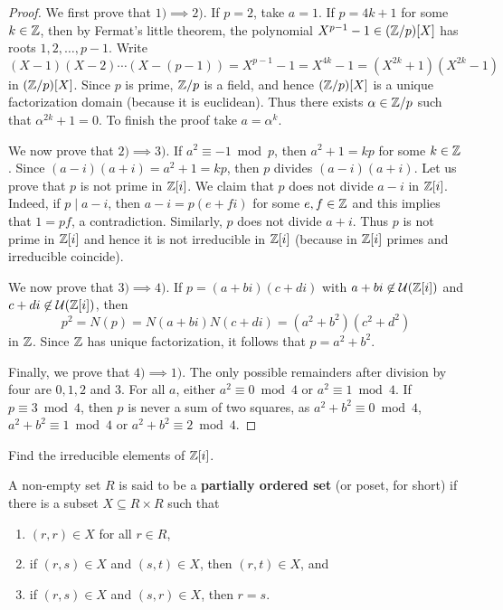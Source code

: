 \begin{proof}
    We first prove that $1)\implies 2)$. If $p=2$, take $a=1$. If $p=4k+1$ for some $k\in\mathbb{Z}$, then
    by Fermat's little theorem, the polynomial 
    $X^{p-1}-1\in(\mathbb{Z}/p)[X]$ has roots $1,2,\dots,p-1$. Write
    \[
    (X-1)(X-2)\cdots (X-(p-1))=X^{p-1}-1=X^{4k}-1=(X^{2k}+1)(X^{2k}-1)
    \]
    in $(\mathbb{Z}/p)[X]$. Since $p$ is prime, $\mathbb{Z}/p$ is a field, and hence 
    $(\mathbb{Z}/p)[X]$ is a unique factorization domain (because it is euclidean). Thus 
    there exists $\alpha\in\mathbb{Z}/p$ such that $\alpha^{2k}+1=0$. To finish the proof
    take $a=\alpha^k$. 
    
    We now prove that $2)\implies 3)$. If $a^2\equiv-1\bmod p$, then $a^2+1=kp$ 
    for some $k\in\mathbb{Z}$. Since $(a-i)(a+i)=a^2+1=kp$, then $p$ divides $(a-i)(a+i)$. Let us prove that $p$ is not prime in $\mathbb{Z}[i]$. 
    We claim that $p$ does not divide $a-i$ in $\mathbb{Z}[i]$. Indeed, if $p\mid a-i$, then
    $a-i=p(e+fi)$ for some $e,f\in\mathbb{Z}$ and this implies that $1=pf$, a contradiction. Similarly,
    $p$ does not divide $a+i$. Thus $p$ is not prime in $\mathbb{Z}[i]$ 
    and hence it is not irreducible in $\mathbb{Z}[i]$ (because in $\mathbb{Z}[i]$ primes and irreducible coincide). 
    
    We now prove that $3)\implies 4)$. If $p=(a+bi)(c+di)$ with $a+bi\not\in\mathcal{U}(\mathbb{Z}[i])$
    and  $c+di\not\in\mathcal{U}(\mathbb{Z}[i])$, then
    \[
    p^2=N(p)=N(a+bi)N(c+di)=(a^2+b^2)(c^2+d^2)
    \]
    in $\mathbb{Z}$. Since $\mathbb{Z}$ has unique factorization, it follows that $p=a^2+b^2$. 
    
    Finally, we prove that $4)\implies 1)$. 
    The only possible remainders after division by four are $0,1,2$ and $3$.  
    For all $a$, either $a^2\equiv 0\bmod 4$ or $a^2\equiv 1\bmod 4$. 
    If $p\equiv3\bmod 4$, then $p$ is never a sum of two squares, as 
    $a^2+b^2\equiv 0\bmod 4$, $a^2+b^2\equiv 1\bmod 4$ or $a^2+b^2\equiv 2\bmod 4$. 
\end{proof}

\begin{exercise}
\label{xca:Z[i]irreducibles}
Find the irreducible elements of $\mathbb{Z}[i]$. 
\end{exercise}



\begin{definition}
A non-empty set $R$ is said to be a \textbf{partially ordered set} (or poset, for short) 
if there is a subset $X\subseteq R\times R$ such that
\begin{enumerate}
    \item $(r,r)\in X$ for all $r\in R$, 
    \item if $(r,s)\in X$ and $(s,t)\in X$, then $(r,t)\in X$, and 
    \item if $(r,s)\in X$ and $(s,r)\in X$, then $r=s$. 
\end{enumerate}
\end{definition}

